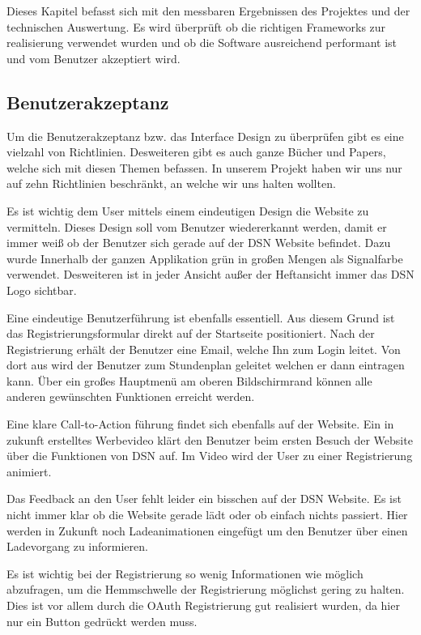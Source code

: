 Dieses Kapitel befasst sich mit den messbaren Ergebnissen des Projektes und der technischen Auswertung. Es wird überprüft ob die richtigen Frameworks zur realisierung verwendet wurden und ob die Software ausreichend performant ist und vom Benutzer akzeptiert wird.

\subsection{Benutzerakzeptanz}
Um die Benutzerakzeptanz bzw. das Interface Design zu überprüfen gibt es eine vielzahl von Richtlinien. Desweiteren gibt es auch ganze Bücher und Papers, welche sich mit diesen Themen befassen. In unserem Projekt haben wir uns nur auf zehn Richtlinien\cite{INTDES1} beschränkt, an welche wir uns halten wollten. 

Es ist wichtig dem User mittels einem eindeutigen Design die Website zu vermitteln. Dieses Design soll vom Benutzer wiedererkannt werden, damit er immer weiß ob der Benutzer sich gerade auf der DSN Website befindet. Dazu wurde Innerhalb der ganzen Applikation grün in großen Mengen als Signalfarbe verwendet. Desweiteren ist in jeder Ansicht außer der Heftansicht immer das DSN Logo sichtbar.

Eine eindeutige Benutzerführung ist ebenfalls essentiell. Aus diesem Grund ist das Registrierungsformular direkt auf der Startseite positioniert. Nach der Registrierung erhält der Benutzer eine Email, welche Ihn zum Login leitet. Von dort aus wird der Benutzer zum Stundenplan geleitet welchen er dann eintragen kann. Über ein großes Hauptmenü am oberen Bildschirmrand können alle anderen gewünschten Funktionen erreicht werden.

Eine klare Call-to-Action führung findet sich ebenfalls auf der Website. Ein in zukunft erstelltes Werbevideo klärt den Benutzer beim ersten Besuch der Website über die Funktionen von DSN auf. Im Video wird der User zu einer Registrierung animiert.

Das Feedback an den User fehlt leider ein bisschen auf der DSN Website. Es ist nicht immer klar ob die Website gerade lädt oder ob einfach nichts passiert. Hier werden in Zukunft noch Ladeanimationen eingefügt um den Benutzer über einen Ladevorgang zu informieren.

Es ist wichtig bei der Registrierung so wenig Informationen wie möglich abzufragen, um die Hemmschwelle der Registrierung möglichst gering zu halten. Dies ist vor allem durch die OAuth Registrierung gut realisiert wurden, da hier nur ein Button gedrückt werden muss.


